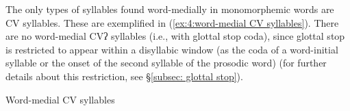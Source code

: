    \z
\z

The only types of syllables found word-medially in monomorphemic words are CV syllables. These are exemplified in (\ref{ex:4:word-medial CV syllables}). There are no word-medial CVʔ syllables (i.e., with glottal stop coda), since glottal stop is restricted to appear within a disyllabic window (as the coda of a word-initial syllable or the onset of the second syllable of the prosodic word) (for further details about this restriction, see §\ref{subsec: glottal stop}).

\ea\label{ex:4:word-medial CV syllables}
{Word-medial CV syllables}
    \z
\z

